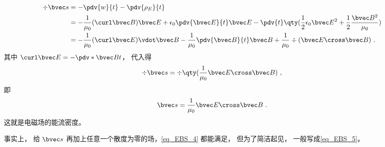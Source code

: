 \begin{equation}
\begin{aligned}
\div \bvec s &=  - \pdv{w}{t} - \pdv{\rho_E}{t}\\
&= -\frac{1}{\mu_0} (\curl \bvec B)\bvec E + \epsilon_0 \pdv{\bvec E}{t} \bvec E - \pdv{t} \qty(\frac12 \epsilon_0 \bvec E^2 + \frac12 \frac{\bvec B^2}{\mu_0})\\
&=  - \frac{1}{\mu_0} (\curl \bvec E) \vdot \bvec B - \frac{1}{\mu_0}\pdv{\bvec B}{t} \bvec B + \frac{1}{\mu_0}\div (\bvec E \cross \bvec B)~.
\end{aligned}
\end{equation} 
其中 $\curl \bvec E =  -\pdv*{\bvec B}{t}$， 代入得
\begin{equation}\label{eq_EBS_4}
\div \bvec s = \div \qty(\frac{1}{\mu_0}\bvec E \cross \bvec B)~,
\end{equation} 
即
\begin{equation}\label{eq_EBS_5}
\bvec s = \frac{1}{\mu_0}\bvec E \cross \bvec B~.
\end{equation} 
这就是电磁场的能流密度。

事实上， 给 $\bvec s$ 再加上任意一个散度为零的场，\autoref{eq_EBS_4} 都能满足， 但为了简洁起见， 一般写成\autoref{eq_EBS_5}。 





